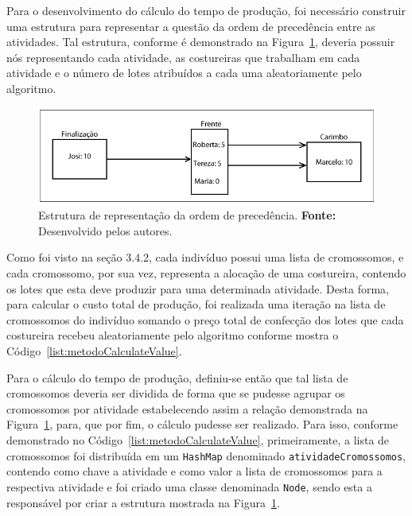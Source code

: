 \par Para o desenvolvimento do cálculo do tempo de produção, foi necessário construir uma estrutura para representar a 
questão da ordem de precedência entre as atividades. Tal estrutura, conforme é demonstrado na Figura~\ref{fig:montagem_node}, 
deveria possuir nós representando cada atividade, as costureiras que trabalham em cada atividade e o número de lotes atribuídos a 
cada uma aleatoriamente pelo algoritmo.

\newpage

\begin{figure}[h!]
	\centerline{\includegraphics[scale=1.1]{./imagens/montagem_node.png}}
	\caption[Estrutura de representação da ordem de precedência.]
	{Estrutura de representação da ordem de precedência. \textbf{Fonte:}
	Desenvolvido pelos autores.}
	\label{fig:montagem_node}
\end{figure}


\par Como foi visto na seção 3.4.2, cada indivíduo possui uma lista de
cromossomos, e cada cromossomo, por sua vez, representa a alocação de uma
costureira, contendo os lotes que esta deve produzir para uma determinada atividade.
Desta forma, para calcular o custo total de produção, foi realizada uma iteração 
na lista de cromossomos do indivíduo somando o preço total de confecção dos lotes
que cada costureira recebeu aleatoriamente pelo algoritmo conforme mostra o Código~\ref{list:metodoCalculateValue}.

\par Para o cálculo do tempo de produção, definiu-se então que tal lista de cromossomos deveria ser
dividida de forma que se pudesse agrupar os cromossomos por atividade estabelecendo assim a relação 
demonstrada na Figura~\ref{fig:montagem_node}, para, que
por fim, o cálculo pudesse ser realizado.
Para isso, conforme demonstrado no Código~\ref{list:metodoCalculateValue}, primeiramente, a lista de 
cromossomos foi distribuída em um \texttt{HashMap} denominado \texttt{atividadeCromossomos}, contendo 
como chave a atividade e como valor a lista de cromossomos para a respectiva atividade e foi criado uma 
classe denominada \texttt{Node}, sendo esta a responsável por criar a estrutura
mostrada na Figura~\ref{fig:montagem_node}.

